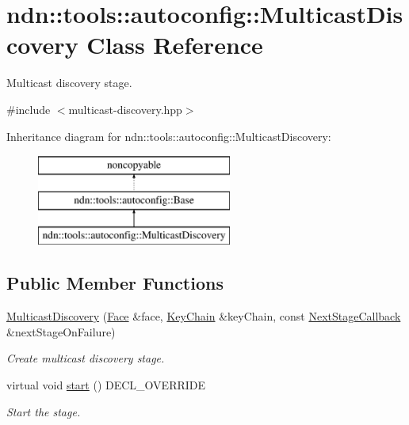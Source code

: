 \hypertarget{classndn_1_1tools_1_1autoconfig_1_1MulticastDiscovery}{}\section{ndn\+:\+:tools\+:\+:autoconfig\+:\+:Multicast\+Discovery Class Reference}
\label{classndn_1_1tools_1_1autoconfig_1_1MulticastDiscovery}


Multicast discovery stage.  




{\ttfamily \#include $<$multicast-\/discovery.\+hpp$>$}

Inheritance diagram for ndn\+:\+:tools\+:\+:autoconfig\+:\+:Multicast\+Discovery\+:\begin{figure}[H]
\begin{center}
\leavevmode
\includegraphics[height=3.000000cm]{classndn_1_1tools_1_1autoconfig_1_1MulticastDiscovery}
\end{center}
\end{figure}
\subsection*{Public Member Functions}
\begin{DoxyCompactItemize}
\item 
\hyperlink{classndn_1_1tools_1_1autoconfig_1_1MulticastDiscovery_a47ed6c664d87e47d4f4ccf60f1326019}{Multicast\+Discovery} (\hyperlink{classndn_1_1Face}{Face} \&face, \hyperlink{classndn_1_1security_1_1KeyChain}{Key\+Chain} \&key\+Chain, const \hyperlink{classndn_1_1tools_1_1autoconfig_1_1Base_a1b9466e64370f1ead34b754096562445}{Next\+Stage\+Callback} \&next\+Stage\+On\+Failure)
\begin{DoxyCompactList}\small\item\em Create multicast discovery stage. \end{DoxyCompactList}\item 
virtual void \hyperlink{classndn_1_1tools_1_1autoconfig_1_1MulticastDiscovery_aca15c0651f4fed07e6d886100f315fbe}{start} () D\+E\+C\+L\+\_\+\+O\+V\+E\+R\+R\+I\+DE\hypertarget{classndn_1_1tools_1_1autoconfig_1_1MulticastDiscovery_aca15c0651f4fed07e6d886100f315fbe}{}\label{classndn_1_1tools_1_1autoconfig_1_1MulticastDiscovery_aca15c0651f4fed07e6d886100f315fbe}

\begin{DoxyCompactList}\small\item\em Start the stage. \end{DoxyCompactList}\end{DoxyCompactItemize}
